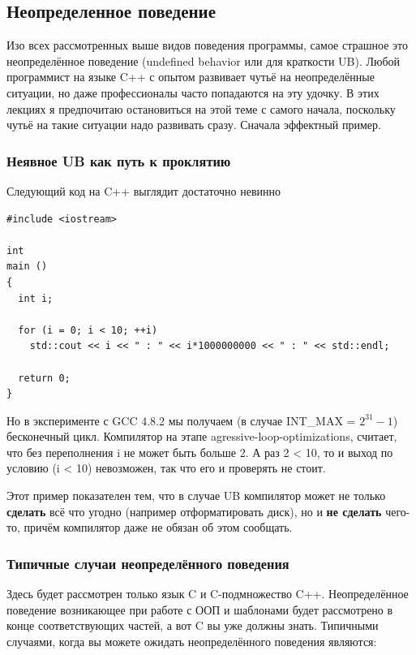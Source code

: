 \documentclass[a4paper,12pt,oneside]{article}
\begin{document}
\pagebreak
\subsection{Неопределенное поведение}\label{UB}

Изо всех рассмотренных выше видов поведения программы, самое страшное это неопределённое поведение (undefined behavior или для краткости UB). Любой программист на языке C++ с опытом развивает чутьё на неопределённые ситуации, но даже профессионалы часто попадаются на эту удочку. В этих лекциях я предпочитаю остановиться на этой теме с самого начала, поскольку чутьё на такие ситуации надо развивать сразу. Сначала эффектный пример.

\subsubsection{Неявное UB как путь к проклятию}\label{HiddenUB}

Следующий код на C++ выглядит достаточно невинно

\begin{lstlisting}
#include <iostream>

int
main ()
{
  int i;

  for (i = 0; i < 10; ++i)
    std::cout << i << " : " << i*1000000000 << " : " << std::endl;

  return 0;
}
\end{lstlisting}

Но в эксперименте с GCC 4.8.2 мы получаем (в случае INT\_MAX = $2^{31} - 1$) бесконечный цикл. Компилятор на этапе agressive-loop-optimizations, считает, что без переполнения i не может быть больше 2. А раз 2 < 10, то и выход по условию (i < 10) невозможен, так что его и проверять не стоит.

Этот пример показателен тем, что в случае UB компилятор может не только \textbf{сделать} всё что угодно (например отформатировать диск), но и \textbf{не сделать} чего-то, причём компилятор даже не обязан об этом сообщать.

\subsubsection{Типичные случаи неопределённого поведения}\label{TypicalUB}

Здесь будет рассмотрен только язык C и C-подмножество C++. Неопределённое поведение возникающее при работе с ООП и шаблонами будет рассмотрено в конце соответствующих частей, а вот C вы уже должны знать. Типичными случаями, когда вы можете ожидать неопределённого поведения являются:
\end{document}
